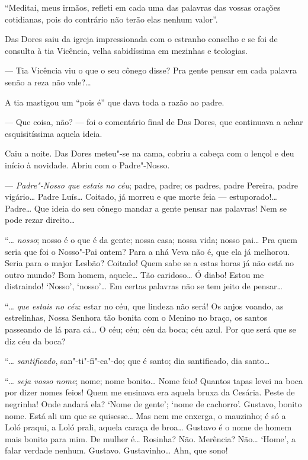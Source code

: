 ``Meditai, meus irmãos, refleti em cada uma das palavras das vossas
orações cotidianas, pois do contrário não terão elas nenhum valor''.

Das Dores saiu da igreja impressionada com o estranho conselho e se foi
de consulta à tia Vicência, velha sabidíssima em mezinhas e teologias.

--- Tia Vicência viu o que o seu cônego disse? Pra gente pensar em cada
palavra senão a reza não vale?\ldots{}

A tia mastigou um ``pois é'' que dava toda a razão ao padre.

--- Que coisa, não? --- foi o comentário final de Das Dores, que
continuava a achar esquisitíssima aquela ideia.


Caiu a noite. Das Dores meteu"-se na cama, cobriu a cabeça com o lençol e
deu início à novidade. Abriu com o Padre"-Nosso.

--- \emph{Padre"-Nosso que estais no céu}; padre, padre; os padres, padre
Pereira, padre vigário\ldots{} Padre Luís\ldots{} Coitado, já morreu e que morte
feia --- estuporado!\ldots{} Padre\ldots{} Que ideia do seu cônego mandar a gente
pensar nas palavras! Nem se pode rezar direito\ldots{}

``\ldots{} \emph{nosso}; nosso é o que é da gente; nossa casa; nossa vida;
nosso pai\ldots{} Pra quem seria que foi o Nosso"-Pai ontem? Para a nhá Veva
não é, que ela já melhorou. Seria para o major Lesbão? Coitado! Quem
sabe se a estas horas já não está no outro mundo? Bom homem, aquele\ldots{}
Tão caridoso\ldots{} Ó diabo! Estou me distraindo! `Nosso', `nosso'\ldots{} Em
certas palavras não se tem jeito de pensar\ldots{}

``\ldots{} \emph{que estais no céu}: estar no céu, que lindeza não será! Os
anjos voando, as estrelinhas, Nossa Senhora tão bonita com o Menino no
braço, os santos passeando de lá para cá\ldots{} O céu; céu; céu da boca; céu
azul. Por que será que se diz céu da boca?

``\ldots{} \emph{santificado}, san"-ti"-fi"-ca"-do; que é santo; dia santificado,
dia santo\ldots{}

``\ldots{} \emph{seja vosso nome}; nome; nome bonito\ldots{} Nome feio! Quantos
tapas levei na boca por dizer nomes feios! Quem me ensinava era aquela
bruxa da Cesária. Peste de negrinha! Onde andará ela? `Nome de gente';
`nome de cachorro'. Gustavo, bonito nome. Está ali um que se quisesse\ldots{}
Mas nem me enxerga, o mauzinho; é só a Loló praqui, a Loló prali, aquela
caraça de broa\ldots{} Gustavo é o nome de homem mais bonito para mim. De
mulher é\ldots{} Rosinha? Não. Merência? Não\ldots{} `Home', a falar verdade
nenhum. Gustavo. Gustavinho\ldots{} Ahn, que sono!

